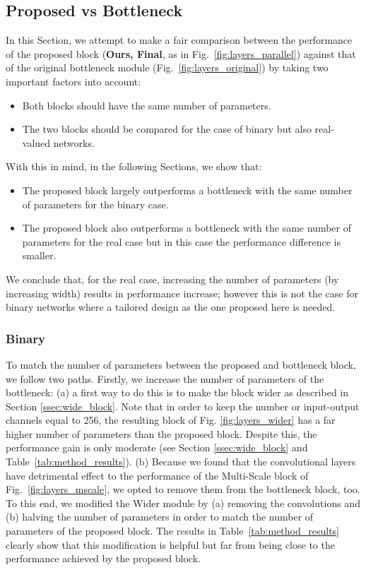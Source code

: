 \documentclass[10pt,journal,compsoc]{IEEEtran}
\begin{document}
\subsection{Proposed vs Bottleneck} \label{sec:binaryvsreal}
In this Section, we attempt to make a fair comparison between the performance of the proposed block (\textbf{Ours, Final}, as in Fig.~\ref{fig:layers_parallel}) against that of the original bottleneck module (Fig.~\ref{fig:layers_original}) by taking two important factors into account:
\begin{itemize}\item
          Both blocks should have the same number of parameters.
    \item
          The two blocks should be compared for the case of binary but also real-valued networks.
\end{itemize}
With this in mind, in the following Sections, we show that:
\begin{itemize}\item
          The proposed block largely outperforms a bottleneck with the same number of parameters for the binary case.
    \item
          The proposed block also outperforms a bottleneck with the same number of parameters for the real case but in this case the performance difference is smaller.
\end{itemize}
We conclude that, for the real case, increasing the number of parameters (by increasing width) results in performance increase; however this is not the case for binary networks where a tailored design as the one proposed here is needed.

\subsubsection{Binary} \label{sec:binary}

To match the number of parameters between the proposed and bottleneck block, we follow two paths. Firstly, we increase the number of parameters of the bottleneck: (a) a first way to do this is to make the block wider as described in Section \ref{ssec:wide_block}. Note that in order to keep the number or input-output channels equal to 256, the resulting block of Fig. \ref{fig:layers_wider} has a far higher number of parameters than the proposed block. Despite this, the performance gain is only moderate (see Section \ref{ssec:wide_block} and Table~\ref{tab:method_results}). (b) Because we found that the  convolutional layers have detrimental effect to the performance of the Multi-Scale block of Fig.~\ref{fig:layers_mscale}, we opted to remove them from the bottleneck block, too. To this end, we modified the Wider module by (a) removing the  convolutions and (b) halving the number of parameters in order to match the number of parameters of the proposed  block. The results in Table~\ref{tab:method_results} clearly show that this modification is helpful but far from being close to the performance achieved by the proposed block.
\end{document}

